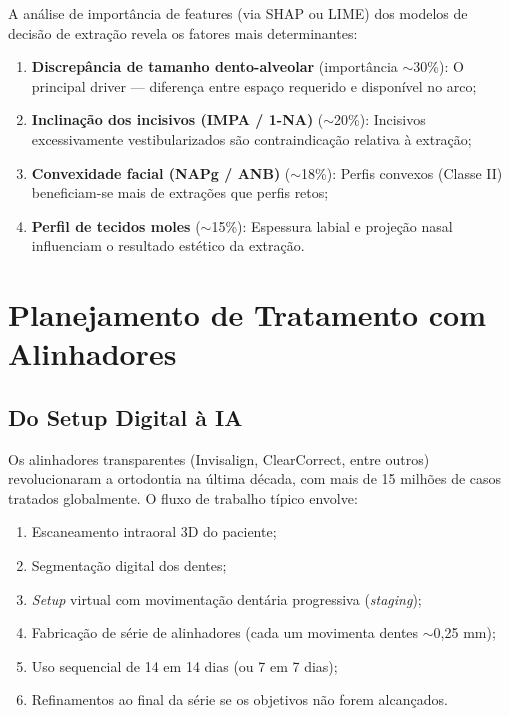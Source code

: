 A análise de importância de features (via SHAP ou LIME) dos modelos de decisão de extração revela os fatores mais determinantes:
\begin{enumerate}
    \item \textbf{Discrepância de tamanho dento-alveolar} (importância $\sim$30\%): O principal driver --- diferença entre espaço requerido e disponível no arco;
    \item \textbf{Inclinação dos incisivos (IMPA / 1-NA)} ($\sim$20\%): Incisivos excessivamente vestibularizados são contraindicação relativa à extração;
    \item \textbf{Convexidade facial (NAPg / ANB)} ($\sim$18\%): Perfis convexos (Classe II) beneficiam-se mais de extrações que perfis retos;
    \item \textbf{Perfil de tecidos moles} ($\sim$15\%): Espessura labial e projeção nasal influenciam o resultado estético da extração.
\end{enumerate}

\section{Planejamento de Tratamento com Alinhadores}

\subsection{Do Setup Digital à IA}

Os alinhadores transparentes (Invisalign\textregistered, ClearCorrect\textregistered, entre outros) revolucionaram a ortodontia na última década, com mais de 15 milhões de casos tratados globalmente. O fluxo de trabalho típico envolve:
\begin{enumerate}
    \item Escaneamento intraoral 3D do paciente;
    \item Segmentação digital dos dentes;
    \item \textit{Setup} virtual com movimentação dentária progressiva (\textit{staging});
    \item Fabricação de série de alinhadores (cada um movimenta dentes $\sim$0,25 mm);
    \item Uso sequencial de 14 em 14 dias (ou 7 em 7 dias);
    \item Refinamentos ao final da série se os objetivos não forem alcançados.
\end{enumerate}

